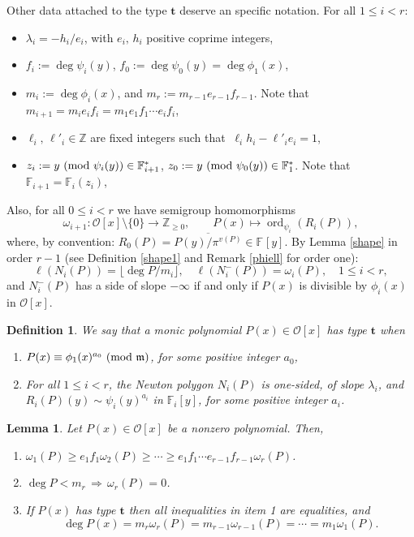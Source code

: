 \documentclass{amsart}
\newtheorem{lemma}[theorem]{Lemma}
\newtheorem{definition}[theorem]{Definition}
\newcommand{\Z}{\mathbb Z}
\def\op{\operatorname}
\def\dg{\op{deg}}
\def\ff#1{\mathbb{F}_{#1}}
\def\imp{\,\Longrightarrow\,}
\def\la{\lambda}
\def\lra{\longrightarrow}
\def\m{{\mathfrak m}}
\def\md#1{\ \mbox{\rm(mod }{#1})}
\def\om{\omega}
\def\oo{{\mathcal O}}
\def\ord{\op{ord}}
\def\ty{\mathbf{t}}
\def\zpx{\oo[x]}
\begin{document}
Other data attached to the type $\ty$ deserve an specific notation. For all $1\le i<r$:
\begin{itemize}
\item $\la_i=-h_i/e_i$, with $e_i,\,h_i$ positive coprime integers,
\item $f_i:=\dg \psi_i(y)$, $f_0:=\dg \psi_0(y)=\dg \phi_1(x)$,  
\item $m_i:=\dg \phi_i(x)$, and $m_r:=m_{r-1}e_{r-1}f_{r-1}$. Note that $m_{i+1}=m_ie_if_i=m_1e_1f_1\cdots e_if_i$,
\item $\ell_i,\,\ell'_i\in\Z$ are fixed integers such that $\ \ell_i h_i-\ell'_ie_i=1$, 
\item $z_i:=y \md{\psi_i(y)}\in\ff{i+1}^*$, $z_0:=y \md{\psi_0(y)}\in\ff{1}^*$. Note that $\ff{i+1}=\ff{i}(z_i)$,
\end{itemize}
Also, for all $0\le i<r$ we have semigroup homomorphisms $$
\om_{i+1}\colon \zpx\setminus\{0\} \lra\Z_{\ge 0},\qquad P(x)\mapsto  \ord_{\psi_i}(R_i(P)),$$
where, by convention: $R_0(P)=\overline{P(y)/\pi^{v(P)}}\in\ff{}[y]$. By Lemma \ref{shape} in order $r-1$ (see Definition \ref{shape1} and Remark \ref{phiell} for order one):
\begin{equation}\label{om=length}
\ell(N_i(P))=\lfloor \deg P/m_i\rfloor,\quad  \ell(N_i^-(P))=\om_i(P), \quad 1\le i< r,
\end{equation}
and $N_i^-(P)$ has a side of slope $-\infty$ if and only if $P(x)$ is divisible by $\phi_i(x)$ in $\zpx$. 

\begin{definition}\label{type}
We say that a monic polynomial $P(x)\in\zpx$ has type $\ty$ when 
\begin{enumerate}
 \item $P(x)\equiv \phi_1(x)^{a_0} \md{\m}$, for some positive integer $a_0$,
\item  For all $1\le i<r$, the Newton polygon $N_i(P)$ is one-sided, of slope $\la_i$, and
 $R_i(P)(y)\sim\psi_i(y)^{a_i}$ in $\ff{i}[y]$, for some positive integer $a_i$. 
\end{enumerate}
\end{definition}

\begin{lemma}\label{typedegree}
Let $P(x)\in\zpx$ be a nonzero polynomial. Then,
\begin{enumerate}
 \item $\om_1(P)\ge e_1f_1\om_2(P)\ge\cdots\ge e_1f_1\cdots e_{r-1}f_{r-1}\om_r(P)$.
\item $\deg P<m_r\imp\om_r(P)=0$.
\item If $P(x)$ has type $\ty$ then all inequalities in item 1 are equalities, and $$\dg P(x)=m_r\om_r(P)=m_{r-1}\om_{r-1}(P)=\cdots =m_1\om_1(P).$$
\end{enumerate}
\end{lemma}
\end{document}
